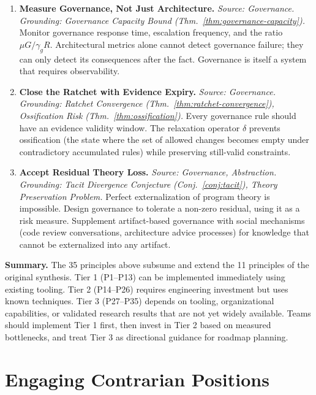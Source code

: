 \documentclass[11pt, a4paper, logo, copyright]{googledeepmind}
\begin{document}
\begin{enumerate}[label=\textbf{P\arabic*.}, leftmargin=3em, resume]
\item \textbf{Measure Governance, Not Just Architecture.}
\emph{Source: Governance. Grounding: Governance Capacity Bound (Thm.~\ref{thm:governance-capacity}).}
Monitor governance response time, escalation frequency, and the ratio $\mu G / \gamma_g R$. Architectural metrics alone cannot detect governance failure; they can only detect its consequences after the fact. Governance is itself a system that requires observability.

\item \textbf{Close the Ratchet with Evidence Expiry.}
\emph{Source: Governance. Grounding: Ratchet Convergence (Thm.~\ref{thm:ratchet-convergence}), Ossification Risk (Thm.~\ref{thm:ossification}).}
Every governance rule should have an evidence validity window. The relaxation operator $\delta$ prevents ossification (the state where the set of allowed changes becomes empty under contradictory accumulated rules) while preserving still-valid constraints.

\item \textbf{Accept Residual Theory Loss.}
\emph{Source: Governance, Abstraction. Grounding: Tacit Divergence Conjecture (Conj.~\ref{conj:tacit}), Theory Preservation Problem.}
Perfect externalization of program theory is impossible. Design governance to tolerate a non-zero residual, using it as a risk measure. Supplement artifact-based governance with social mechanisms (code review conversations, architecture advice processes) for knowledge that cannot be externalized into any artifact.

\end{enumerate}

\medskip
\noindent\textbf{Summary.} The 35 principles above subsume and extend the 11 principles of the original synthesis. Tier 1 (P1--P13) can be implemented immediately using existing tooling. Tier 2 (P14--P26) requires engineering investment but uses known techniques. Tier 3 (P27--P35) depends on tooling, organizational capabilities, or validated research results that are not yet widely available. Teams should implement Tier 1 first, then invest in Tier 2 based on measured bottlenecks, and treat Tier 3 as directional guidance for roadmap planning.
\section{Engaging Contrarian Positions}
\label{sec:contrarian}
\end{document}
